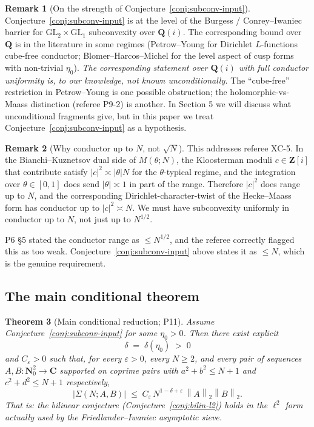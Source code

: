 \documentclass[11pt]{article}
\newtheorem{theorem}{Theorem}[section]
\theoremstyle{definition}
\newtheorem{remark}[theorem]{Remark}
\newcommand{\Nz}{\mathbf{N}_0}
\newcommand{\Z}{\mathbf{Z}}
\newcommand{\Q}{\mathbf{Q}}
\newcommand{\C}{\mathbf{C}}
\newcommand{\Zi}{\Z[i]}
\newcommand{\Qi}{\Q(i)}
\newcommand{\norm}[1]{\left\lVert #1\right\rVert}
\begin{document}
\begin{remark}[On the strength of Conjecture~\ref{conj:subconv-input}]\label{rmk:strength}
Conjecture~\ref{conj:subconv-input} is at the level of the Burgess / Conrey--Iwaniec barrier for $\mathrm{GL}_2\times\mathrm{GL}_1$ subconvexity over $\Qi$. The corresponding bound over $\Q$ is in the literature in some regimes (Petrow--Young \cite{petrow-young} for Dirichlet $L$-functions cube-free conductor; Blomer--Harcos--Michel \cite{BHM} for the level aspect of cusp forms with non-trivial $\eta_0$). \emph{The corresponding statement over $\Qi$ with full conductor uniformity is, to our knowledge, not known unconditionally.} The ``cube-free'' restriction in Petrow--Young is one possible obstruction; the holomorphic-vs-Maass distinction (referee P9-2) is another. In Section 5 we will discuss what unconditional fragments give, but in this paper we treat Conjecture~\ref{conj:subconv-input} as a hypothesis.
\end{remark}

\begin{remark}[Why conductor up to $N$, not $\sqrt N$]\label{rmk:cond-uniformity}
This addresses referee XC-5. In the Bianchi--Kuznetsov dual side of $M(\theta;N)$, the Kloosterman moduli $c\in\Zi$ that contribute satisfy $|c|^2\asymp |\theta|N$ for the $\theta$-typical regime, and the integration over $\theta\in[0,1]$ does send $|\theta|\asymp 1$ in part of the range. Therefore $|c|^2$ does range up to $N$, and the corresponding Dirichlet-character-twist of the Hecke--Maass form has conductor up to $|c|^2\asymp N$. We must have subconvexity uniformly in conductor up to $N$, not just up to $N^{1/2}$.

P6 \S5 stated the conductor range as $\le N^{1/2}$, and the referee correctly flagged this as too weak. Conjecture~\ref{conj:subconv-input} above states it as $\le N$, which is the genuine requirement.
\end{remark}

\subsection{The main conditional theorem}\label{ssec:typeII-main}

\begin{theorem}[Main conditional reduction; P11]\label{thm:main-conditional}
Assume Conjecture~\ref{conj:subconv-input} for some $\eta_0>0$. Then there exist explicit
\[
\delta\;=\;\delta(\eta_0)\;>\;0
\]
and $C_\varepsilon>0$ such that, for every $\varepsilon>0$, every $N\ge 2$, and every pair of sequences $A,B:\Nz^2\to\C$ supported on coprime pairs with $a^2+b^2\le N+1$ and $c^2+d^2\le N+1$ respectively,
\[
\bigl|\Sigma(N;A,B)\bigr|\;\le\;C_\varepsilon\,N^{1-\delta+\varepsilon}\,\norm{A}_2\norm{B}_2.
\]
That is: the bilinear conjecture (Conjecture~\ref{conj:bilin-l2}) holds in the $\ell^2$ form actually used by the Friedlander--Iwaniec asymptotic sieve.
\end{theorem}
\end{document}
